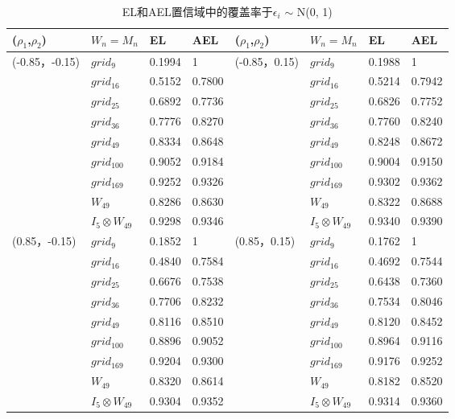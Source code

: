 \documentclass[onecolumn]{ctexart}	%
\begin{document}
\begingroup					%
\renewcommand{\arraystretch}{0.99} %

\begin{table}[H]
\setlength{\abovecaptionskip}{0.cm}%
\centering
\caption{EL和AEL置信域中的覆盖率于$\epsilon_{i}$ $\sim$ N(0, 1)}
\begin{tabular*}{\hsize}{@{}@{\extracolsep{\fill}}llllllll@{}}
\hline
($\rho_{1}$,$\rho_{2}$)&$W_n=M_n$ & EL&AEL&($\rho_{1}$,$\rho_{2}$)&$W_n=M_n$ & EL&AEL\\
\hline
(-0.85，-0.15)& $grid_{9}$  	 & 0.1994 & 1          &  (-0.85，0.15)	& $grid_{9}$ & 0.1988 & 1   \\
		& $grid_{16}$   	& 0.5152 & 0.7800 	&                 		& $grid_{16}$  & 0.5214 & 0.7942 \\
		& $grid_{25}$   	& 0.6892 & 0.7736 	&                 		& $grid_{25}$  & 0.6826 & 0.7752 \\
		& $grid_{36}$   	& 0.7776 & 0.8270	&                	 	& $grid_{36}$  & 0.7760 & 0.8240\\
		& $grid_{49}$   	& 0.8334 & 0.8648 	&                 		& $grid_{49}$  & 0.8248 & 0.8672\\
                      & $grid_{100}$ 	& 0.9052 & 0.9184 	&                 		& $grid_{100}$ & 0.9004 & 0.9150\\
                      & $grid_{169}$ 	& 0.9252 & 0.9326 	&                 		& $grid_{169}$ & 0.9302 & 0.9362 \\
                      & $W_{49}$ 	& 0.8286 & 0.8630 	&                 		& $W_{49}$ & 0.8322 & 0.8688 \\
                      & $I_{5}\otimes W_{49}$&0.9298& 0.9346 &     &$I_{5}\otimes W_{49}$&0.9340 &0.9390   \\
\hline
(0.85，-0.15) & $grid_{9}$   	& 0.1852 & 1           &  (0.85，0.15)	& $grid_{9}$  & 0.1762 & 1	\\
		& $grid_{16}$   	& 0.4840 & 0.7584	&                 		& $grid_{16}$ & 0.4692 & 0.7544\\
		& $grid_{25}$   	& 0.6676 & 0.7538	&                 		& $grid_{25}$ & 0.6438 & 0.7360\\
		& $grid_{36}$   	& 0.7706 & 0.8232  &                 		& $grid_{36}$ & 0.7534 & 0.8046 \\
		& $grid_{49}$   	& 0.8116 & 0.8510  &                  		& $grid_{49}$ & 0.8120 & 0.8452\\
                      & $grid_{100}$ 	& 0.8896 & 0.9052  &                 		& $grid_{100}$ & 0.8964 & 0.9116\\
                      & $grid_{169}$ 	& 0.9204 & 0.9300     &           		& $grid_{169}$ & 0.9176 & 0.9252\\
                      & $W_{49}$ 	& 0.8320 & 0.8614  &                 		&  $W_{49}$ & 0.8182 & 0.8520  \\
                      & $I_{5}\otimes W_{49}$&  0.9304 &0.9352	&     &$I_{5}\otimes W_{49}$&  0.9314 &0.9360   \\
\hline
\end{tabular*}
\end{table}
\end{document}
